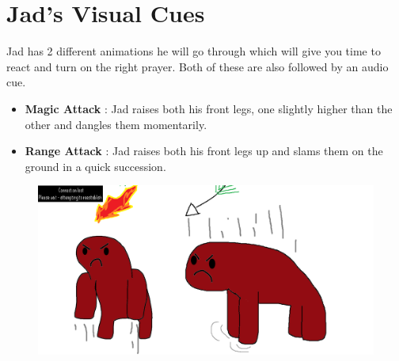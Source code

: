 \documentclass{article}
\begin{document}
\section{Jad's Visual Cues}
Jad has 2 different animations he will go through which will give you time to react and turn on the right prayer. Both of these are also followed by an audio cue. 
\begin{itemize}
    \item \textbf{Magic Attack} : Jad raises both his front legs, one slightly higher than the other and dangles them momentarily. 
    \item \textbf{Range Attack} : Jad raises both his front legs up and slams them on the ground in a quick succession.
\end{itemize}
\vspace{2mm}
\begin{figure}[!h]
    \centering
    \includegraphics[scale = .3]{jadfight.png}
\end{figure}
\newpage
\end{document}

